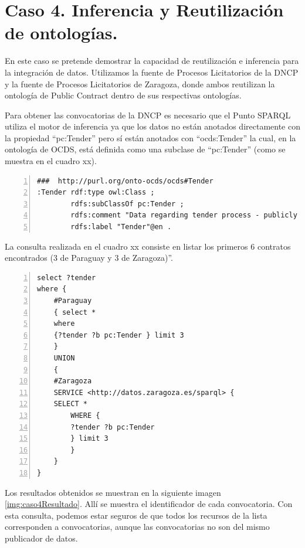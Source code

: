 \section{Caso 4. Inferencia y Reutilización de ontologías. }

En este caso se pretende demostrar la capacidad de reutilización e inferencia para la integración de datos. Utilizamos la fuente de Procesos Licitatorios de la DNCP y la fuente de Procesos Licitatorios de Zaragoza, donde ambos reutilizan la ontología de Public Contract dentro de sus respectivas ontologías.

Para obtener las convocatorias de la DNCP es necesario que el Punto SPARQL utiliza el motor de inferencia ya que los datos no están anotados directamente con la propiedad “pc:Tender” pero sí están anotados con “ocds:Tender” la cual, en la ontología de OCDS, está definida como una subclase de “pc:Tender” (como se muestra en el cuadro xx).

\begin{lstlisting}[captionpos=b, caption=Información referente al proceso licitatorio cuyo identificacor es, label=lst:caso4-1,  numbers=left,  numberstyle=\tiny\color{mygray},
    basicstyle=\ttfamily,frame=single]
###  http://purl.org/onto-ocds/ocds#Tender
:Tender rdf:type owl:Class ;
        rdfs:subClassOf pc:Tender ;
        rdfs:comment "Data regarding tender process - publicly inviting prospective contractors to submit bids for evaluation and selecting a winner or winners"@en ;
        rdfs:label "Tender"@en .
 \end{lstlisting}

 

 La consulta realizada en el cuadro xx consiste en listar los primeros 6 contratos encontrados (3 de Paraguay y 3 de Zaragoza)”.

 \begin{lstlisting}[captionpos=b, caption=Información referente al proceso licitatorio cuyo identificacor es, label=lst:caso4-2,  numbers=left,  numberstyle=\tiny\color{mygray},
    basicstyle=\ttfamily,frame=single]
select ?tender
where {
    #Paraguay
    { select * 
    where 
    {?tender ?b pc:Tender } limit 3 
    }
    UNION 
    { 
    #Zaragoza
    SERVICE <http://datos.zaragoza.es/sparql> {
    SELECT * 
        WHERE {
        ?tender ?b pc:Tender 
        } limit 3
        }
    }
}
 \end{lstlisting}

 Los resultados obtenidos se muestran en la siguiente imagen \ref{img:caso4Resultado}. Allí se muestra el identificador de cada convocatoria. Con esta consulta, podemos estar seguros de que todos los recursos de la lista corresponden a convocatorias, aunque las convocatorias no son del mismo publicador de datos.



